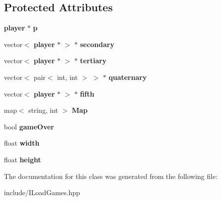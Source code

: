 \subsection*{Protected Attributes}
\begin{DoxyCompactItemize}
\item 
\mbox{\label{class_i_load_game_a6a804cef122ad96b599d3affc6eeb6df}} 
\textbf{ player} $\ast$ {\bfseries p}
\item 
\mbox{\label{class_i_load_game_a10a78df6b8a4a4d4f3147885a54f390a}} 
vector$<$ \textbf{ player} $\ast$ $>$ $\ast$ {\bfseries secondary}
\item 
\mbox{\label{class_i_load_game_a27cf0eaecf3beca07ccc334c8717dc99}} 
vector$<$ \textbf{ player} $\ast$ $>$ $\ast$ {\bfseries tertiary}
\item 
\mbox{\label{class_i_load_game_a0a0453bd024995e7a06409eb72220306}} 
vector$<$ pair$<$ int, int $>$ $>$ $\ast$ {\bfseries quaternary}
\item 
\mbox{\label{class_i_load_game_af55d5295be24b48d10124a7188b96953}} 
vector$<$ \textbf{ player} $\ast$ $>$ $\ast$ {\bfseries fifth}
\item 
\mbox{\label{class_i_load_game_a04c1994e5e13c43f691bbd697e08b1aa}} 
map$<$ string, int $>$ {\bfseries Map}
\item 
\mbox{\label{class_i_load_game_ad102429eafd4f3ac825ecc86bf63f73b}} 
bool {\bfseries game\+Over}
\item 
\mbox{\label{class_i_load_game_a75531d37b6221098135305a95702bcf9}} 
float {\bfseries width}
\item 
\mbox{\label{class_i_load_game_a834ad5275c2bb2203aeae90ef8955592}} 
float {\bfseries height}
\end{DoxyCompactItemize}


The documentation for this class was generated from the following file\+:\begin{DoxyCompactItemize}
\item 
include/I\+Load\+Games.\+hpp\end{DoxyCompactItemize}
